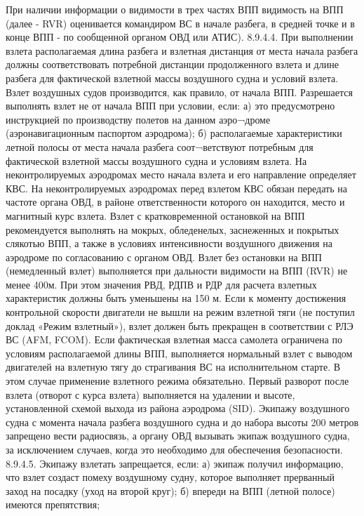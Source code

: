 При наличии информации о видимости в трех частях ВПП видимость на ВПП (далее - RVR) оценивается командиром ВС в начале разбега, в средней точке и в конце ВПП - по сообщенной органом ОВД или АТИС). 
8.9.4.4. При выполнении взлета располагаемая длина разбега и взлетная дистанция от места начала разбега должны соответствовать потребной дистанции продолженного взлета и длине разбега для фактической взлетной массы воздушного судна и условий взлета. 
Взлет воздушных судов производится, как правило, от начала ВПП. 
Разрешается выполнять взлет не от начала ВПП при условии, если:
а)	это предусмотрено инструкцией по производству полетов на данном аэро¬дроме (аэронавигационным паспортом аэродрома);
б)	располагаемые характеристики летной полосы от места начала разбега соот¬ветствуют потребным для фактической взлетной массы воздушного судна и условиям взлета. 
На неконтролируемых аэродромах место начала взлета и его направление определяет КВС. На неконтролируемых аэродромах перед взлетом КВС обязан передать на частоте органа ОВД, в районе ответственности которого он находится, место и магнитный курс взлета. 
Взлет с кратковременной остановкой на ВПП рекомендуется выполнять на мокрых, обледенелых, заснеженных и покрытых слякотью ВПП, а также в условиях интенсивности воздушного движения на аэродроме по согласованию с органом ОВД. 
Взлет без остановки на ВПП (немедленный взлет) выполняется при дальности видимости на ВПП (RVR) не менее 400м. При этом значения РВД, РДПВ и РДР для расчета взлетных характеристик должны быть уменьшены на 150 м. 
Если к моменту достижения контрольной скорости двигатели не вышли на режим взлетной тяги (не поступил доклад «Режим взлетный»), взлет должен быть прекращен в соответствии с РЛЭ ВС (AFM, FCOM). 
Если фактическая взлетная масса самолета ограничена по условиям располагаемой длины ВПП, выполняется нормальный взлет с выводом двигателей на взлетную тягу до страгивания ВС на исполнительном старте. В этом случае применение взлетного режима обязательно.
Первый разворот после взлета (отворот с курса взлета) выполняется на удалении и высоте, установленной схемой выхода из района аэродрома (SID).
Экипажу воздушного судна с момента начала разбега воздушного судна и до набора высоты 200 метров запрещено вести радиосвязь, а органу ОВД вызывать экипаж воздушного судна, за исключением случаев, когда это необходимо для обеспечения безопасности. 
8.9.4.5.  Экипажу взлетать запрещается, если:
а)	экипаж получил информацию, что взлет создаст помеху воздушному судну, которое выполняет прерванный заход на посадку (уход на второй круг); 
б)	впереди на ВПП (летной полосе) имеются препятствия; 

